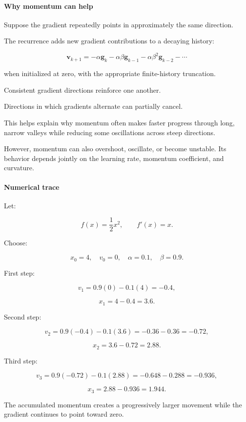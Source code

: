 \paragraph{Why momentum can help}\label{02-foundations-ii-ch026-why-momentum-can-help}

Suppose the gradient repeatedly points in approximately the same direction.

The recurrence adds new gradient contributions to a decaying history:

\[
\mathbf v_{k+1} = -\alpha\mathbf g_k -\alpha\beta\mathbf g_{k-1} -\alpha\beta^2\mathbf g_{k-2} -\cdots
\]

when initialized at zero, with the appropriate finite-history truncation.

Consistent gradient directions reinforce one another.

Directions in which gradients alternate can partially cancel.

This helps explain why momentum often makes faster progress through long, narrow valleys while reducing some oscillations across steep directions.

However, momentum can also overshoot, oscillate, or become unstable. Its behavior depends jointly on the learning rate, momentum coefficient, and curvature.

\paragraph{Numerical trace}\label{02-foundations-ii-ch026-numerical-trace}

Let:

\[
f(x)=\frac12x^2,\qquad f'(x)=x.
\]

Choose:

\[
x_0=4,\quad v_0=0,\quad\alpha=0.1,\quad\beta=0.9.
\]

First step:

\[
v_1=0.9(0)-0.1(4)=-0.4,
\]

\[
x_1=4-0.4=3.6.
\]

Second step:

\[
v_2=0.9(-0.4)-0.1(3.6) =-0.36-0.36=-0.72,
\]

\[
x_2=3.6-0.72=2.88.
\]

Third step:

\[
v_3=0.9(-0.72)-0.1(2.88) =-0.648-0.288=-0.936,
\]

\[
x_3=2.88-0.936=1.944.
\]

The accumulated momentum creates a progressively larger movement while the gradient continues to point toward zero.

